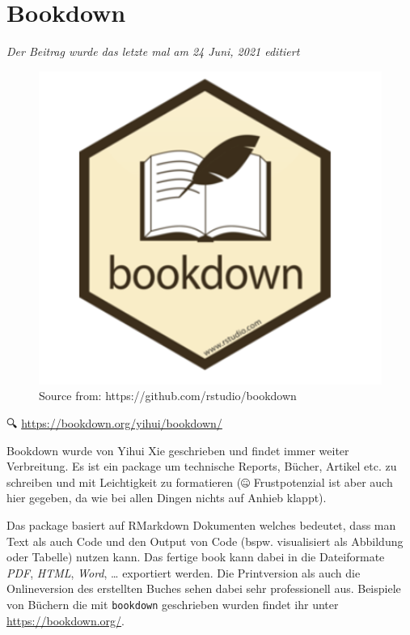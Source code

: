 \documentclass[
]{article}
\begin{document}
\hypertarget{bookdown}{%
\section{Bookdown}\label{bookdown}}

\emph{Der Beitrag wurde das letzte mal am 24 Juni, 2021 editiert}

\begin{figure}

{\centering \includegraphics[width=4.94in]{images/065} 

}

\caption{Source from: https://github.com/rstudio/bookdown}\label{fig:unnamed-chunk-296}
\end{figure}

🔍 \url{https://bookdown.org/yihui/bookdown/}

Bookdown wurde von Yihui Xie geschrieben und findet immer weiter Verbreitung. Es ist ein package um technische Reports, Bücher, Artikel etc. zu schreiben und mit Leichtigkeit zu formatieren (🤐 Frustpotenzial ist aber auch hier gegeben, da wie bei allen Dingen nichts auf Anhieb klappt).

Das package basiert auf RMarkdown Dokumenten welches bedeutet, dass man Text als auch Code und den Output von Code (bspw. visualisiert als Abbildung oder Tabelle) nutzen kann. Das fertige book kann dabei in die Dateiformate \emph{PDF}, \emph{HTML}, \emph{Word}, \ldots{} exportiert werden. Die Printversion als auch die Onlineversion des erstellten Buches sehen dabei sehr professionell aus. Beispiele von Büchern die mit \texttt{bookdown} geschrieben wurden findet ihr unter \url{https://bookdown.org/}.
\end{document}
